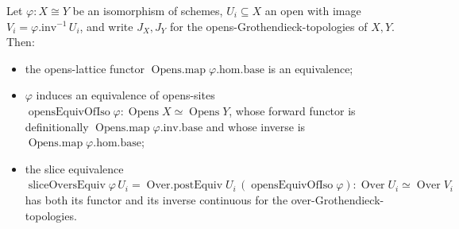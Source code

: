 \begin{lemma}
  \label{lem:slice_overs_equiv_continuity}
  Let \(\varphi : X \cong Y\) be an isomorphism of schemes, \(U_i \subseteq X\) an open with image
  \(V_i = \varphi.\mathrm{inv}^{-1}\,U_i\), and write \(J_X, J_Y\) for the opens-Grothendieck-topologies
  of \(X, Y\). Then:
  \begin{itemize}
    \item the opens-lattice functor \(\operatorname{Opens.map}\varphi.\mathrm{hom}.\mathrm{base}\) is an
      equivalence;
    \item \(\varphi\) induces an equivalence of opens-sites \(\operatorname{opensEquivOfIso}\varphi :
      \operatorname{Opens} X \simeq \operatorname{Opens} Y\), whose forward functor is definitionally
      \(\operatorname{Opens.map}\varphi.\mathrm{inv}.\mathrm{base}\) and whose inverse is
      \(\operatorname{Opens.map}\varphi.\mathrm{hom}.\mathrm{base}\);
    \item the slice equivalence \(\operatorname{sliceOversEquiv}\varphi\,U_i = \operatorname{Over.postEquiv}
      U_i\,(\operatorname{opensEquivOfIso}\varphi) : \operatorname{Over} U_i \simeq \operatorname{Over} V_i\)
      has both its functor and its inverse continuous for the over-Grothendieck-topologies.
  \end{itemize}
\end{lemma}
